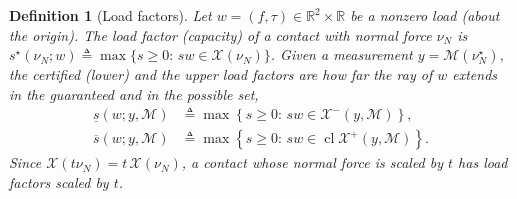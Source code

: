 \documentclass[11pt,a4paper]{article}
\theoremstyle{plain}
\newtheorem{definition}[theorem]{Definition}
\newcommand{\R}{\mathbb{R}}
\newcommand{\X}{\mathcal X}
\begin{document}

\begin{definition}[Load factors]
\label{def:load_factor}
    Let $w=(f,\tau)\in\R^2\times\R$ be a nonzero load (about the origin). The \textit{load factor} (capacity) of a contact with normal force $\nu_N$ is
    $s^\star(\nu_N;w)\triangleq\max\{s\ge0:\,sw\in\X(\nu_N)\}$. Given a measurement $y=\mathcal M(\nu_N^\star)$, the \textit{certified} (lower) and the \textit{upper} load factors are
    how far the ray of $w$ extends in the guaranteed and in the possible set,
    \begin{align}
        \underline s(w;y,\mathcal M)&\triangleq\max\left\{s\ge0:\,sw\in\X^-(y,\mathcal M)\right\},\\
        \overline s(w;y,\mathcal M)&\triangleq\max\left\{s\ge0:\,sw\in\operatorname{cl}\X^+(y,\mathcal M)\right\}.
    \end{align}
    Since $\X(t\nu_N)=t\,\X(\nu_N)$, a contact whose normal force is scaled by $t$ has load factors scaled by $t$.
\end{definition}
\end{document}
